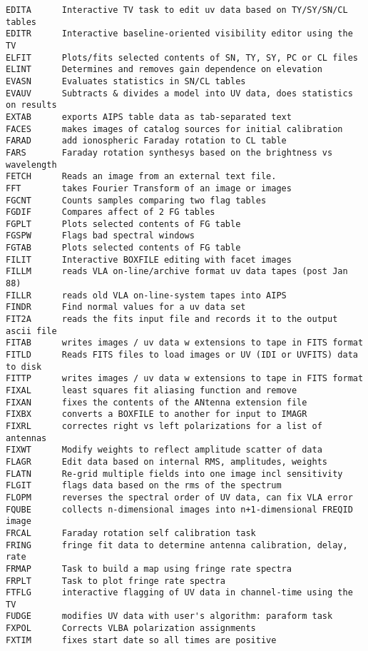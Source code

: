 \begin{verbatim}
EDITA      Interactive TV task to edit uv data based on TY/SY/SN/CL tables
EDITR      Interactive baseline-oriented visibility editor using the TV
ELFIT      Plots/fits selected contents of SN, TY, SY, PC or CL files
ELINT      Determines and removes gain dependence on elevation
EVASN      Evaluates statistics in SN/CL tables
EVAUV      Subtracts & divides a model into UV data, does statistics on results
EXTAB      exports AIPS table data as tab-separated text
FACES      makes images of catalog sources for initial calibration
FARAD      add ionospheric Faraday rotation to CL table
FARS       Faraday rotation synthesys based on the brightness vs wavelength
FETCH      Reads an image from an external text file.
FFT        takes Fourier Transform of an image or images
FGCNT      Counts samples comparing two flag tables
FGDIF      Compares affect of 2 FG tables
FGPLT      Plots selected contents of FG table
FGSPW      Flags bad spectral windows
FGTAB      Plots selected contents of FG table
FILIT      Interactive BOXFILE editing with facet images
FILLM      reads VLA on-line/archive format uv data tapes (post Jan 88)
FILLR      reads old VLA on-line-system tapes into AIPS
FINDR      Find normal values for a uv data set
FIT2A      reads the fits input file and records it to the output ascii file
FITAB      writes images / uv data w extensions to tape in FITS format
FITLD      Reads FITS files to load images or UV (IDI or UVFITS) data to disk
FITTP      writes images / uv data w extensions to tape in FITS format
FIXAL      least squares fit aliasing function and remove
FIXAN      fixes the contents of the ANtenna extension file
FIXBX      converts a BOXFILE to another for input to IMAGR
FIXRL      correctes right vs left polarizations for a list of antennas
FIXWT      Modify weights to reflect amplitude scatter of data
FLAGR      Edit data based on internal RMS, amplitudes, weights
FLATN      Re-grid multiple fields into one image incl sensitivity
FLGIT      flags data based on the rms of the spectrum
FLOPM      reverses the spectral order of UV data, can fix VLA error
FQUBE      collects n-dimensional images into n+1-dimensional FREQID image
FRCAL      Faraday rotation self calibration task
FRING      fringe fit data to determine antenna calibration, delay, rate
FRMAP      Task to build a map using fringe rate spectra
FRPLT      Task to plot fringe rate spectra
FTFLG      interactive flagging of UV data in channel-time using the TV
FUDGE      modifies UV data with user's algorithm: paraform task
FXPOL      Corrects VLBA polarization assignments
FXTIM      fixes start date so all times are positive

\end{verbatim}
